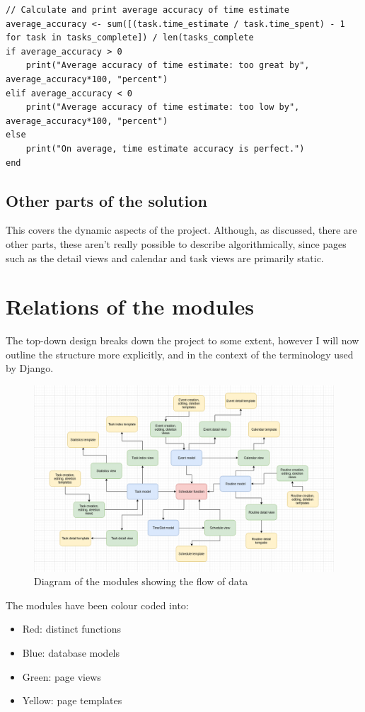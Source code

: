 \documentclass{article}
\begin{document}
\begin{lstlisting}[breaklines]
// Calculate and print average accuracy of time estimate
average_accuracy <- sum([(task.time_estimate / task.time_spent) - 1 for task in tasks_complete]) / len(tasks_complete
if average_accuracy > 0
    print("Average accuracy of time estimate: too great by", average_accuracy*100, "percent")
elif average_accuracy < 0
    print("Average accuracy of time estimate: too low by", average_accuracy*100, "percent")
else
    print("On average, time estimate accuracy is perfect.")
end
\end{lstlisting}

\subsection{Other parts of the solution}
This covers the dynamic aspects of the project.
Although, as discussed, there are other parts,
these aren't really possible to describe algorithmically,
since pages such as the detail views and calendar and task views are primarily static.

\section{Relations of the modules}
The top-down design breaks down the project to some extent,
however I will now outline the structure more explicitly,
and in the context of the terminology used by Django.

\begin{figure}[H]
	\centering
	\includegraphics[width=\linewidth]{Screenshots/mytime_modular_design.png}
	\caption{Diagram of the modules showing the flow of data}
	\label{fig:modular_design}
\end{figure}

The modules have been colour coded into:
\begin{itemize}
	\item Red: distinct functions
	\item Blue: database models
	\item Green: page views
	\item Yellow: page templates
\end{itemize}
\end{document}
